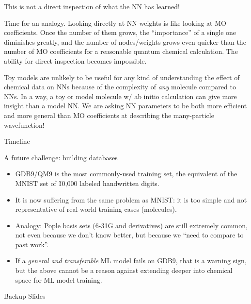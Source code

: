 \documentclass[xetex,compress]{beamer}
\begin{document}
\begin{frame}{}
  This is not a direct inspection of what the NN has learned!

  Time for an analogy. Looking directly at NN weights is like looking at MO coefficients. Once the number of them grows, the ``importance'' of a single one diminishes greatly, and the number of nodes/weights grows even quicker than the number of MO coefficients for a reasonable quantum chemical calculation. The ability for direct inspection becomes impossible.

  Toy models are unlikely to be useful for any kind of understanding the effect of chemical data on NNs because of the complexity of \emph{any} molecule compared to NNs. In a way, a toy or model molecule w/ ab initio calculation can give more insight than a model NN. We are asking NN parameters to be both more efficient and more general than MO coefficients at describing the many-particle wavefunction!
\end{frame}


\begin{frame}{Timeline}
\end{frame}

\begin{frame}{A future challenge: building databases}
  \begin{itemize}
  \item GDB9/QM9 is the most commonly-used training set, the equivalent of the MNIST set of \~10,000 labeled handwritten digits.
  \item It is now suffering from the same problem as MNIST: it is too simple and not representative of real-world training cases (molecules).
  \item Analogy: Pople basis sets (6-31G and derivatives) are still extremely common, not even because we don't know better, but because we ``need to compare to past work''.
  \item If a \emph{general and transferable} ML model fails on GDB9, that is a warning sign, but the above cannot be a reason against extending deeper into chemical space for ML model training.
  \end{itemize}
\end{frame}

\begin{frame}{Backup Slides}
\end{frame}
\end{document}
